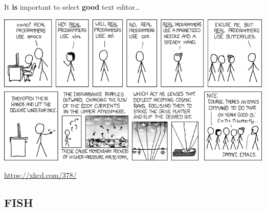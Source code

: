 \documentclass[compress, ucs, xelatex, 11pt, xcolor=svgnames,
  hyperref={
    bookmarks=true,
    unicode=true,
    colorlinks=true,
    pdftitle={Linux, command line and MetaCentrum},
    plainpages=false,
    pdfauthor={Vojtech Zeisek},
    pdfsubject={Course about use of Linux command line, writing shell scripts and using MetaCentrum of CESNET},
    pdfcreator={XeLaTeX},
    pdfkeywords={Linux, GNU, BASH, shell, command line, MetaCentrum},
    linkcolor=Red,
    anchorcolor=Blue,
    citecolor=Purple,
    filecolor=DodgerBlue,
    menucolor=DarkOrchid,
    urlcolor=DeepSkyBlue,
    pdftex},
  url={hyphens, lowtilde} %
  ]{beamer}
\begin{document}
\begin{frame}{It \textbf{is} important to select \textbf{good} text editor\ldots}
  \begin{center}
    \includegraphics[width=\textwidth-1cm]{real_programmers.png}
  \end{center}
  \begin{flushright}
    \url{https://xkcd.com/378/}
  \end{flushright}
\end{frame}

\subsection{FISH}
\end{document}
